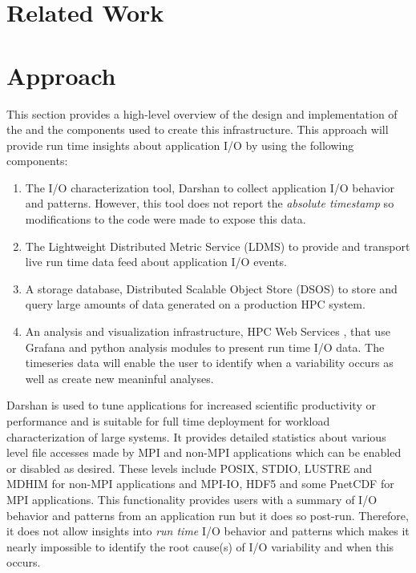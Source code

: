 \documentclass[conference]{IEEEtran}
\begin{document}
\section{Related Work}

\section{Approach}

This section provides a high-level overview of the design and implementation of the \Darshan and the components used to create this infrastructure. This approach will provide run time insights about application I/O by using the following components:
\begin{enumerate}
    \item The I/O characterization tool, Darshan  to collect application I/O behavior and patterns. However, this tool does not report the \emph{absolute timestamp} so modifications to the code were made to expose this data.
    \item The Lightweight Distributed Metric Service (LDMS)  to provide and transport live run time data feed about application I/O events.
    \item A storage database, Distributed Scalable Object Store (DSOS)  to store and query large amounts of data generated on a production HPC system.
    \item An analysis and visualization infrastructure, HPC Web Services , that use Grafana  and python analysis modules to present run time I/O data. The timeseries data will enable the user to identify when a variability occurs as well as create new meaninful analyses.
\end{enumerate}

Darshan is used to tune applications for increased scientific productivity or performance and is suitable for full time deployment for workload characterization of large systems. It provides detailed statistics about various level file accesses made by MPI and non-MPI applications which can be enabled or disabled as desired. These levels include POSIX, STDIO, LUSTRE and MDHIM for non-MPI applications and MPI-IO, HDF5 and some PnetCDF for MPI applications. This functionality provides users with a summary of I/O behavior and patterns from an application run but it does so post-run. Therefore, it does not allow insights into \emph{run time} I/O behavior and patterns which makes it nearly impossible to identify the root cause(s) of I/O variability and when this occurs. 
\end{document}
